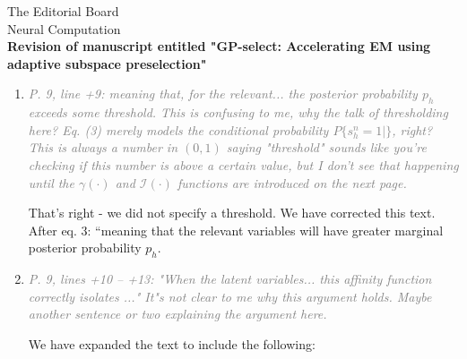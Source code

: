 \documentclass[10pt]{letter}
\newcommand{\rvr}[1]{\textcolor{gray}{#1}}
\renewcommand{\vec}[1]{{\mathbf{#1}}}
\newcommand{\II}{{\cal I}}
\begin{document}
\begin{letter}{
The Editorial Board\\
Neural Computation\\
\vspace{10mm}
\textbf{Revision of manuscript entitled "GP-select: Accelerating EM using adaptive
subspace preselection"}
}
\begin{enumerate}[topsep=3pt,itemsep=2ex,partopsep=1ex,parsep=1ex]
    This was worded poorly and we have re-written the sentence as follows: \\
Here, the variables $s_1$ and $s_3$ yield high affinity and would thus be considered relevant for $\vec{y}^{(n)}$.

    \item \rvr{\emph{P. 9, line +9:   meaning that, for the relevant... the posterior probability $p_h$ exceeds some threshold.  This is confusing to me, why the talk of thresholding here? Eq. (3) merely models the conditional probability $P\{ s_h^n = 1 |   \}$, right? This is always a number in $(0,1)$ saying "threshold"  sounds like you're checking if this number is above a certain value, but I don't see that happening until the $\gamma( \cdot )$ and $\mathcal{I}( \cdot )$ functions are introduced on the next page.}}

That’s right - we did not specify a threshold. We have corrected this text. 
After eq. 3: “meaning that the relevant variables will have greater marginal posterior probability $p_h$.

    \item \rvr{\emph{P. 9, lines +10 -- +13: "When the latent variables... this affinity function correctly isolates ..."  It"s not clear to me why this argument holds. Maybe another sentence or two explaining the argument here.}}

We have expanded the text to include the following:\\
%
%


\end{enumerate}
\end{letter}
\end{document}
